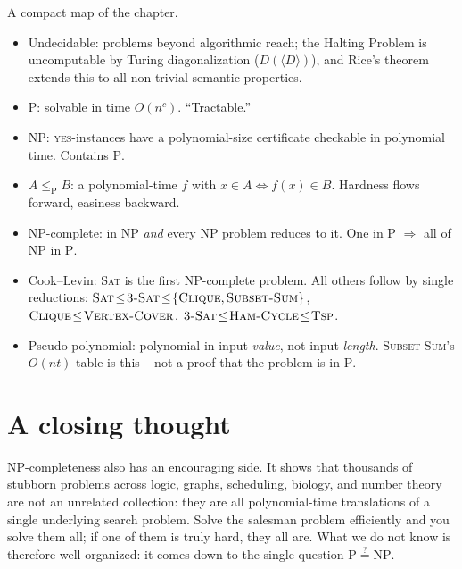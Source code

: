\begin{complexitybox}
A compact map of the chapter.
\begin{itemize}
  \item Undecidable: problems beyond algorithmic reach; the Halting Problem is uncomputable by Turing diagonalization ($D(\langle D \rangle)$), and Rice's theorem extends this to all non-trivial semantic properties.
  \item $\mathrm{P}$: solvable in time $O(n^c)$. ``Tractable.''
  \item $\mathrm{NP}$: \textsc{yes}-instances have a polynomial-size certificate
        checkable in polynomial time. Contains $\mathrm{P}$.
  \item $A\le_{\mathrm P}B$: a polynomial-time $f$ with $x\in A \iff f(x)\in B$.
        Hardness flows forward, easiness backward.
  \item NP-complete: in $\mathrm{NP}$ \emph{and} every $\mathrm{NP}$ problem
        reduces to it. One in $\mathrm{P}$ $\Rightarrow$ all of $\mathrm{NP}$ in
        $\mathrm{P}$.
  \item Cook--Levin: \textsc{Sat} is the first NP-complete problem. All others
        follow by single reductions:
        $\textsc{Sat}\!\le\!\textsc{3-Sat}\!\le\!\{\textsc{Clique},
        \textsc{Subset-Sum}\}$, $\textsc{Clique}\!\le\!\textsc{Vertex-Cover}$,
        $\textsc{3-Sat}\!\le\!\textsc{Ham-Cycle}\!\le\!\textsc{Tsp}$.
  \item Pseudo-polynomial: polynomial in input \emph{value}, not input
        \emph{length}. \textsc{Subset-Sum}'s $O(nt)$ table is this -- not a proof
        that the problem is in $\mathrm{P}$.
\end{itemize}
\end{complexitybox}

\section*{A closing thought}

NP-completeness also has an encouraging side. It shows that thousands of
stubborn problems across logic, graphs, scheduling, biology, and number theory
are not an unrelated collection: they are all polynomial-time translations of a
single underlying search problem. Solve the salesman problem efficiently and you
solve them all; if one of them is truly hard, they all are. What we do not know
is therefore well organized: it comes down to the single question
$\mathrm{P}\overset{?}{=}\mathrm{NP}$.

